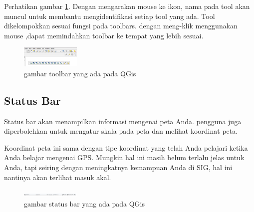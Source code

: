 Perhatikan gambar \ref{toolbar1}. Dengan mengarakan mouse ke ikon, nama pada tool akan muncul untuk membantu mengidentifikasi setiap tool yang ada. Tool dikelompokkan sesuai fungsi pada toolbars. dengan meng-klik menggunakan mouse ,dapat memindahkan toolbar ke tempat yang lebih sesuai.
\begin{figure}[ht]
    \centerline{\includegraphics[width=0.25\textwidth]{figures/toolbar1}}
    \caption{gambar toolbar yang ada pada QGis}
    \label{toolbar1}
    \end{figure}
    
\subsection{Status Bar}
Status bar akan menampilkan informasi mengenai peta Anda. pengguna juga diperbolehkan untuk mengatur skala pada peta dan melihat koordinat peta.

Koordinat peta ini sama dengan tipe koordinat yang telah Anda pelajari ketika Anda belajar mengenai GPS.
Mungkin hal ini masih belum terlalu jelas untuk Anda, tapi seiring dengan meningkatnya kemampuan Anda di SIG, hal ini nantinya akan terlihat masuk akal.
\begin{figure}[ht]
    \centerline{\includegraphics[width=0.25\textwidth]{figures/statbar}}
    \caption{gambar status bar yang ada pada QGis}
    \label{statbar}
    \end{figure}

